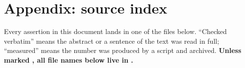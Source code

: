 \section*{Appendix: source index}
\label{app:sources}

Every assertion in this document lands in one of the files below. ``Checked verbatim'' means the
abstract or a sentence of the text was read in full; ``measured'' means the number was produced by a
script and archived. \textbf{Unless marked , all file names below live in
.}

\vspace{3pt}
